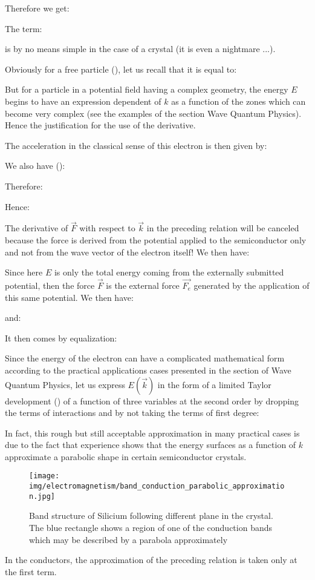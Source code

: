 	Therefore we get:
	
	The term:
	
	is by no means simple in the case of a crystal (it is even a nightmare ...).

	Obviously for a free particle (), let us recall that it is equal to:
	
	But for a particle in a potential field having a complex geometry, the energy $E$ begins to have an expression dependent of $k$ as a function of the zones which can become very complex (see the examples of the section Wave Quantum Physics). Hence the justification for the use of the derivative.

	The acceleration in the classical sense of this electron is then given by:
	
	We also have ():
	
	Therefore:
	
	Hence:
	
	The derivative of $\vec{F}$ with respect to $\vec{k}$ in the preceding relation will be canceled because the force is derived from the potential applied to the semiconductor only and not from the wave vector of the electron itself! We then have:
	
	Since here $E$ is only the total energy coming from the externally submitted potential, then the force $\vec{F}$ is the external force $\vec{F_e}$ generated by the application of this same potential. We then have:
	
	and:
	
	It then comes by equalization:
	
	Since the energy of the electron can have a complicated mathematical form according to the practical applications cases presented in the section of Wave Quantum Physics, let us express $E(\vec{k})$ in the form of a limited Taylor  development () of a function of three variables at the second order by dropping the terms of interactions and by not taking the terms of first degree:
	
	In fact, this rough but still acceptable approximation in many practical cases is due to the fact that experience shows that the energy surfaces as a function of $k$ approximate a parabolic shape in certain semiconductor crystals.
	\begin{figure}[H]
		\centering
		\texttt{[image: img/electromagnetism/band\_conduction\_parabolic\_approximation.jpg]}
		\caption[]{Band structure of Silicium following different plane in the crystal. The blue rectangle shows a region of one of the conduction bands which may be described by a parabola approximately}
	\end{figure}
	In the conductors, the approximation of the preceding relation is taken only at the first term.

